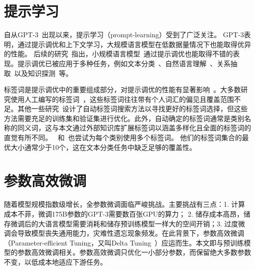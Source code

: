 \section{提示学习}
自从GPT-3~\cite{brown2020language}出现以来，提示学习（prompt-learning）受到了广泛关注。  
GPT-3表明，通过提示调优和上下文学习，大规模语言模型在低数据量情况下也能取得优异的性能。  
后续的研究~\cite{schick2020exploiting, schick2020s}指出，小规模语言模型~\cite{radford2018improving, devlin2019bert, liu2019roberta, lan2019albert}通过提示调优也能取得不错的表现。提示调优已被应用于多种任务，例如文本分类~\cite{schick2020exploiting}、自然语言理解~\cite{schick2020s, liu2021gpt}、关系抽取~\cite{han2021ptr,chen2021adaprompt}以及知识探测~\cite{petroni2019language, liu2021gpt}等。

标签词是提示调优中的重要组成部分，对提示调优的性能有显著影响~\cite{holtzman2021surface, gao2020making}。大多数研究使用人工编写的标签词~\cite{schick2020exploiting}，这些标签词往往带有个人词汇的偏见且覆盖范围不足。其他一些研究~\cite{gao2020making, shin2020autoprompt,liu2021gpt,schick2020automatically}设计了自动标签词搜索方法以寻找更好的标签词选择，但这些方法需要充足的训练集和验证集进行优化。此外，自动确定的标签词通常是类别名称的同义词，这与本文通过外部知识库扩展标签词以涵盖多样化且全面的标签词的直觉有所不同。  
~\citet{schick2020automatically}和~\citet{shin2020autoprompt}也尝试为每个类别使用多个标签词。  
他们的标签词集合的最优大小通常少于10个，这在文本分类任务中缺乏足够的覆盖性。

\section{参数高效微调}
随着模型规模指数级增长，全参数微调面临严峻挑战。主要挑战有三点：1. 计算成本不菲，微调175B参数的GPT-3需要数百张GPU的算力； 2. 储存成本高昂，储存微调后的大语言模型需要消耗和储存预训练模型一样大的空间开销；3. 过度微调会导致模型丧失通用能力，灾难性遗忘现象频发。在此背景下，参数高效微调（Parameter-efficient Tuning，又叫Delta Tuning~\cite{ding2022delta}）应运而生。本文即与预训练模型的参数高效微调相关。参数高效微调只优化一小部分参数，而保留绝大多数参数不变，以低成本地适应下游任务。

